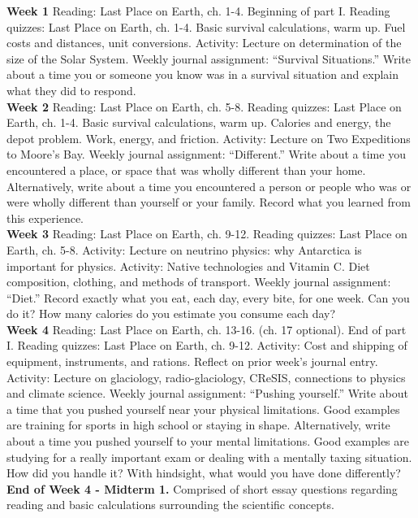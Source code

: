 \documentclass[10pt]{article}
\begin{document}
\begin{outline}[enumerate]
\1 \textbf{Week 1}
\2 Reading: Last Place on Earth, ch. 1-4. Beginning of part I.
\2 Reading quizzes: Last Place on Earth, ch. 1-4.
\2 Basic survival calculations, warm up.  Fuel costs and distances, unit conversions.
\2 Activity: Lecture on determination of the size of the Solar System.
\2 Weekly journal assignment: ``Survival Situations.'' Write about a time you or someone you know was in a survival situation and explain what they did to respond. \\
\1\textbf{Week 2}
\2 Reading: Last Place on Earth, ch. 5-8.
\2 Reading quizzes: Last Place on Earth, ch. 1-4.
\2 Basic survival calculations, warm up.  Calories and energy, the depot problem.  Work, energy, and friction.
\2 Activity: Lecture on Two Expeditions to Moore's Bay.
\2 Weekly journal assignment: ``Different.''  Write about a time you encountered a place, or space that was wholly different than your home.  Alternatively, write about a time you encountered a person or people who was or were wholly different than yourself or your family.  Record what you learned from this experience. \\
\1 \textbf{Week 3}
\2 Reading: Last Place on Earth, ch. 9-12.
\2 Reading quizzes: Last Place on Earth, ch. 5-8.
\2 Activity: Lecture on neutrino physics: why Antarctica is important for physics.
\2 Activity: Native technologies and Vitamin C.  Diet composition, clothing, and methods of transport.
\2 Weekly journal assignment: ``Diet.''  Record exactly what you eat, each day, every bite, for one week.  Can you do it?  How many calories do you estimate you consume each day? \\
\1 \textbf{Week 4}
\2 Reading: Last Place on Earth, ch. 13-16. (ch. 17 optional). End of part I.
\2 Reading quizzes: Last Place on Earth, ch. 9-12.
\2 Activity: Cost and shipping of equipment, instruments, and rations.  Reflect on prior week's journal entry.
\2 Activity: Lecture on glaciology, radio-glaciology, CReSIS, connections to physics and climate science.
\2 Weekly journal assignment: ``Pushing yourself.''  Write about a time that you pushed yourself near your physical limitations.  Good examples are training for sports in high school or staying in shape.  Alternatively, write about a time you pushed yourself to your mental limitations.  Good examples are studying for a really important exam or dealing with a mentally taxing situation.  How did you handle it?  With hindsight, what would you have done differently? \\
\1 \textbf{End of Week 4 - Midterm 1.} Comprised of short essay questions regarding reading and basic calculations surrounding the scientific concepts. \\

\end{outline}
\end{document}
